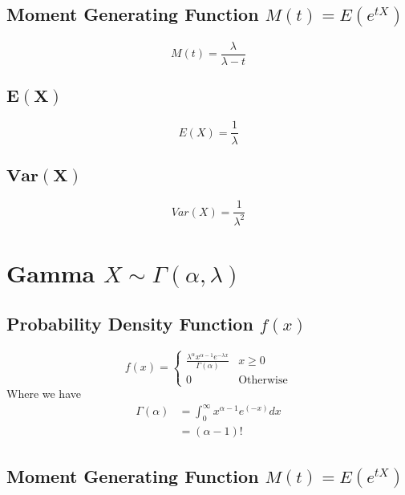 \documentclass[12pt]{article}
\begin{document}
\subsection{Moment Generating Function $M(t)=E(e^{tX})$}

\begin{equation*}
    M(t)=\frac{\lambda}{\lambda -t}
\end{equation*}

\subsection{$\bm{E(X)}$}

\begin{equation*}
  E(X) = \frac{1}{\lambda}
\end{equation*}

\subsection{$\bm{Var(X)}$}

\begin{equation*}
  Var(X)= \frac{1}{\lambda^{2}}
\end{equation*}

\newpage
\section{Gamma $X \sim \Gamma(\alpha,\lambda)$}
\subsection{Probability Density Function $f(x)$}

\begin{equation*}
  f(x) =
  \begin{cases}
     \frac{\lambda^{\alpha} x^{\alpha -1} e^{-\lambda x}}{\Gamma(\alpha)} & x \geq 0 \\
     0 & \text{Otherwise}
  \end{cases}
\end{equation*}
Where we have
\begin{align*}
  \Gamma(\alpha) &= \int_{0}^{\infty}x^{\alpha -1}e^(-x) dx \\
                 &= (\alpha -1)!
\end{align*}
\subsection{Moment Generating Function $M(t)=E(e^{tX})$}
\end{document}

